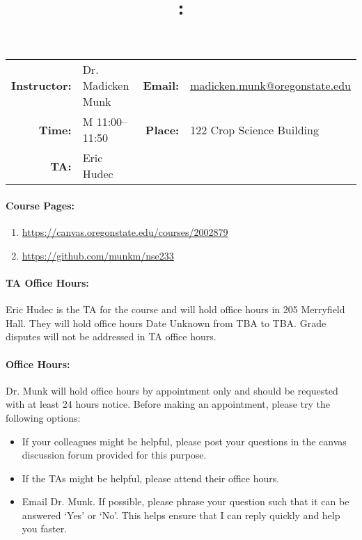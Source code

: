 \documentclass[11pt, a4paper]{article}
\title{\CourseNumber: \CourseTitle\\}
\author{\CourseUniversity}
\date{\CourseSemester \CourseYear}
\makeatletter
\newcommand{\CourseInstructor}{Dr. Madicken Munk\xspace}%
\newcommand{\CourseDays}{M\xspace}%
\newcommand{\CourseStart}{11:00\xspace}%
\newcommand{\CourseEnd}{11:50\xspace}%
\newcommand{\CourseInstructorEmail}{madicken.munk@oregonstate.edu}
\newcommand{\CourseRoom}{122\xspace}%
\newcommand{\CourseBuilding}{Crop Science Building\xspace}%
\newcommand{\TeachingAssistant}{Eric Hudec\xspace}%
\newcommand{\TAOfficeHourDays}{Date Unknown \xspace}%
\newcommand{\TAOfficeHourStart}{TBA\xspace}%
\newcommand{\TAOfficeHourEnd}{TBA\xspace}%
\newcommand{\TAOfficeHourPlace}{205 Merryfield Hall\xspace}
\newcommand{\MunkOfficeHourDays}{Mondays\xspace}%
\newcommand{\MunkOfficeHourStart}{9:00 a.m.\xspace}%
\newcommand{\MunkOfficeHourEnd}{9:50 a.m.\xspace}%
\newcommand{\MunkOfficeHourPlace}{OSU Radiation Center Library\xspace}
\makeatother
\begin{document}
\maketitle
\renewcommand{\arraystretch}{1.5}
\begin{center}
\begin{table}[h]
\begin{tabularx}{\textwidth}{rXrX}
\hline
\textbf{Instructor:} & \CourseInstructor & \textbf{Email:} & \href{mailto:\CourseInstructorEmail}{\CourseInstructorEmail} \\
\textbf{Time:} & \CourseDays \CourseStart -- \CourseEnd & \textbf{Place:} & \CourseRoom \CourseBuilding \\
\textbf{TA:} & \TeachingAssistant & & \\
\hline
\end{tabularx}
\end{table}
\end{center}

\paragraph{Course Pages:}
\begin{enumerate}
        \item \url{https://canvas.oregonstate.edu/courses/2002879}
        \item \url{https://github.com/munkm/nse233}
\end{enumerate}

\paragraph{TA Office Hours:} \TeachingAssistant is the TA for the course and will hold
office hours in \TAOfficeHourPlace.
They will hold office hours \TAOfficeHourDays from
\TAOfficeHourStart to \TAOfficeHourEnd.
Grade disputes will not be addressed in TA office hours.

\paragraph{Office Hours:} Dr. Munk  will hold office hours 
by appointment only
and should be requested with at least 24 hours notice.
Before making an appointment, please try the following options:
\begin{itemize}
\item If your colleagues might be helpful, please post your questions in the
        canvas discussion forum provided for this purpose.
\item If the TAs might be helpful, please attend their office hours.
\item Email Dr. Munk. If possible, please phrase your question such that it
        can be answered `Yes' or `No'. This helps ensure that I can reply quickly 
        and help you faster. 
\end{itemize}
\end{document}
